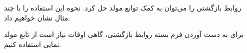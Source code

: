 \p
روابط بازگشتی را می‌توان به کمک توابع مولد حل کرد.
نحوه این استفاده را با چند مثال نشان خواهیم داد.





\p
برای به دست آوردن فرم بسته روابط بازگشتی، گاهی اوقات نیاز است از تابع مولد نمایی استفاده کنیم.

